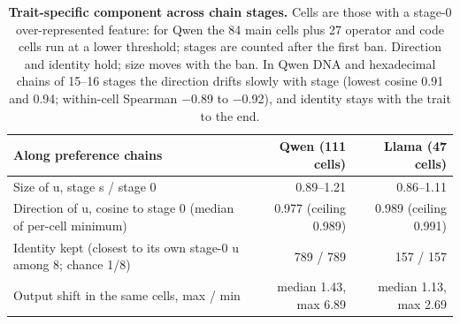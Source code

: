 \begin{table}[p]
\caption{\textbf{Trait-specific component across chain stages.} Cells are those with a stage-0 over-represented feature: for Qwen the 84 main cells plus 27 operator and code cells run at a lower threshold; stages are counted after the first ban. Direction and identity hold; size moves with the ban. In Qwen DNA and hexadecimal chains of 15--16 stages the direction drifts slowly with stage (lowest cosine 0.91 and 0.94; within-cell Spearman $-$0.89 to $-$0.92), and identity stays with the trait to the end.}
\label{edtab:3}
{\tabsize\setlength{\tabcolsep}{4pt}
\begin{tabular}{@{}lrr@{}}
\toprule
\textbf{Along preference chains} & \textbf{Qwen (111 cells)} & \textbf{Llama (47 cells)}\\
\midrule
Size of u, stage s / stage 0 & 0.89--1.21 & 0.86--1.11\\
Direction of u, cosine to stage 0 (median of per-cell minimum) & 0.977 (ceiling 0.989) & 0.989 (ceiling 0.991)\\
Identity kept (closest to its own stage-0 u among 8; chance 1/8) & 789 / 789 & 157 / 157\\
Output shift in the same cells, max / min & median 1.43, max 6.89 & median 1.13, max 2.69\\
\bottomrule
\end{tabular}}
\end{table}


